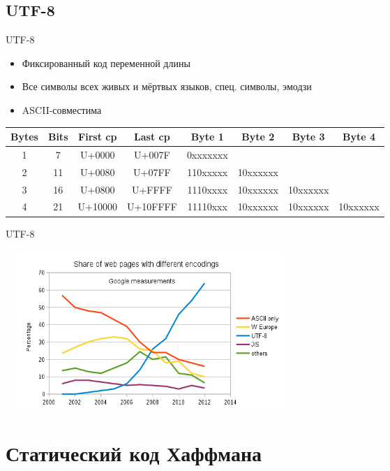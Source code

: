 \documentclass[10pt]{beamer}
\begin{document}
\subsection{UTF-8}
\begin{frame}[fragile]{UTF-8}
\begin{itemize}
    \item Фиксированный код переменной длины
    \item Все символы всех живых и мёртвых языков, спец. символы, эмодзи
    \item ASCII-совместима
\end{itemize}
\begin{center}\footnotesize
\begin{tabular}{ |c|c|c|c|c|c|c|c| } 
\hline
Bytes & Bits & First cp & Last cp & Byte 1 & Byte 2 & Byte 3 & Byte 4 \\
\hline
1 & 7 & U+0000 & U+007F & 0xxxxxxx & & & \\
\hline
2 & 11 & U+0080 & U+07FF & 110xxxxx & 10xxxxxx & & \\
\hline
3 & 16 & U+0800 & U+FFFF & 1110xxxx & 10xxxxxx & 10xxxxxx & \\
\hline
4 & 21 & U+10000 & U+10FFFF & 11110xxx & 10xxxxxx & 10xxxxxx & 10xxxxxx \\
\hline
\end{tabular}
\end{center}
\end{frame}

\begin{frame}[fragile]{UTF-8}
\begin{center}
    \includegraphics[width=11cm, height=6cm]{Term_1/Source/Pirctures/utf8_growth.png}
\end{center}
\end{frame}

\section{Статический код Хаффмана}
\end{document}
